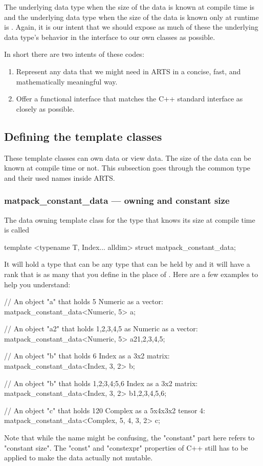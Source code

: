 The underlying data type when the size of the data is known at compile time is 
and the underlying data type when the size of the data is known only at runtime is .
Again, it is our intent that we should expose as much of these the underlying data type's behavior in the interface to our
own classes as possible.

In short there are two intents of these codes:
\begin{enumerate}
\item Represent any data that we might need in ARTS in a concise, fast, and mathematically meaningful way.
\item Offer a functional interface that matches the C++ standard interface as closely as possible.
\end{enumerate}

\subsection{Defining the template classes}
These template classes can own data or view data.  The size of the data can be known at compile time or not.
This subsection goes through the common type and their used names inside ARTS.

\subsubsection{matpack\_constant\_data --- owning and constant size}
The data owning template class for the type that knows its size at compile time is called
\begin{code}
template <typename T, Index... alldim>
struct matpack_constant_data;
\end{code}
It will hold a type  that can be any type that can be held by 
and it will have a rank  that is as many  that you define in the place
of .  Here are a few examples to help you understand:
\begin{code}
// An object "a" that holds 5 Numeric as a vector:
matpack_constant_data<Numeric, 5> a;

// An object "a2" that holds 1,2,3,4,5 as Numeric as a vector:
matpack_constant_data<Numeric, 5> a2{1,2,3,4,5};

// An object "b" that holds 6 Index as a 3x2 matrix:
matpack_constant_data<Index, 3, 2> b;

// An object "b" that holds 1,2;3,4;5,6 Index as a 3x2 matrix:
matpack_constant_data<Index, 3, 2> b{1,2,3,4,5,6};

// An object "c" that holds 120 Complex as a 5x4x3x2 tensor 4:
matpack_constant_data<Complex, 5, 4, 3, 2> c;
\end{code}
Note that while the name might be confusing, the "constant" part here refers to "constant size".  The
"const" and "constexpr" properties of C++ still has to be applied to make the data actually not mutable.

